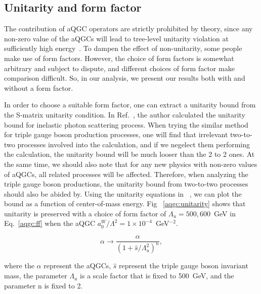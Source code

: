 \subsection{Unitarity and form factor}

The contribution of aQGC operators are strictly prohibited by theory,
since any non-zero value of the aQGCs will lead to tree-level
unitarity violation at sufficiently high energy~\cite{Chapon:2009}. To
dampen the effect of non-unitarity, some people make use of form
factors. However, the choice of form factors is somewhat arbitrary and
subject to dispute, and different choices of form factor make
comparison difficult. So, in our analysis, we present our results
both with and without a form factor.

In order to choose a suitable form factor, one can extract a unitarity
bound from the S-matrix unitarity condition. In
Ref.~\cite{Chapon:2009,AQGC:2001}, the author calculated the unitarity
bound for inelastic photon scattering process. When trying the similar
method for triple gauge boson production processes, one will find that
irrelevant two-to-two processes involved into the calculation, and if we negelect them performing the calculation, the unitarity bound will be much looser than the 2 to 2 ones. At the same time, we should also note
that for any new physics with non-zero values of aQGCs, all related
processes will be affected. Therefore, when analyzing the triple gauge
boson productions, the unitarity bound from two-to-two processes
should also be abided by. Using the unitarity equations in
~\cite{Chapon:2009,AQGC:2001}, we can plot the bound as a function of
center-of-mass energy. Fig ~\ref{aqgc:unitarity} shows that
unitarity is preserved with a choice of form factor of $\Lambda_u
= 500, 600$~GeV in Eq.~\ref{aqgc:ff} when the aQGC $a_0^W/\Lambda^2 = 1
\times 10^{-4}$~GeV$^{-2}$. 

\begin{equation}
 \alpha \rightarrow \frac{\alpha}{(1 + \hat{s}/\Lambda_u^2)^n},
\label{aqgc:ff}
\end{equation}

where the $\alpha$ represent the aQGCs, $\hat{s}$ represent the triple
gauge boson invariant mass, the parameter $\Lambda_{u}$ is a scale
factor that is fixed to 500~GeV, and the parameter n is fixed to 2.

